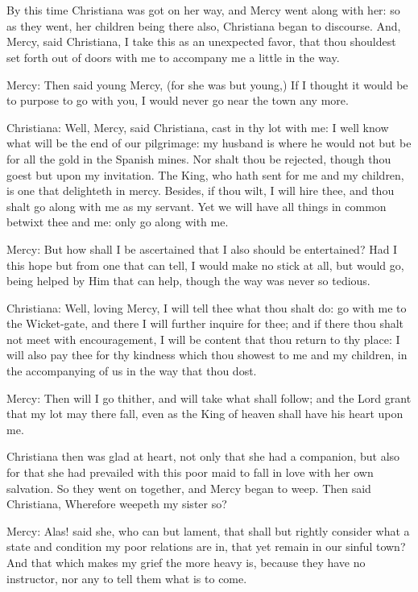 \chapter[THE FIRST STAGE]{}

By this time Christiana was got on her way, and Mercy went along with her: so as they went, her children being there also, Christiana began to discourse. And, Mercy, said Christiana, I take this as an unexpected favor, that thou shouldest set forth out of doors with me to accompany me a little in the way.

Mercy: Then said young Mercy, (for she was but young,) If I thought it would be to purpose to go with you, I would never go near the town any more.

Christiana: Well, Mercy, said Christiana, cast in thy lot with me: I well know what will be the end of our pilgrimage: my husband is where he would not but be for all the gold in the Spanish mines. Nor shalt thou be rejected, though thou goest but upon my invitation. The King, who hath sent for me and my children, is one that delighteth in mercy. Besides, if thou wilt, I will hire thee, and thou shalt go along with me as my servant. Yet we will have all things in common betwixt thee and me: only go along with me.

Mercy: But how shall I be ascertained that I also should be entertained? Had I this hope but from one that can tell, I would make no stick at all, but would go, being helped by Him that can help, though the way was never so tedious.

Christiana: Well, loving Mercy, I will tell thee what thou shalt do: go with me to the Wicket-gate, and there I will further inquire for thee; and if there thou shalt not meet with encouragement, I will be content that thou return to thy place: I will also pay thee for thy kindness which thou showest to me and my children, in the accompanying of us in the way that thou dost.

Mercy: Then will I go thither, and will take what shall follow; and the Lord grant that my lot may there fall, even as the King of heaven shall have his heart upon me.

Christiana then was glad at heart, not only that she had a companion, but also for that she had prevailed with this poor maid to fall in love with her own salvation. So they went on together, and Mercy began to weep. Then said Christiana, Wherefore weepeth my sister so?

Mercy: Alas! said she, who can but lament, that shall but rightly consider what a state and condition my poor relations are in, that yet remain in our sinful town? And that which makes my grief the more heavy is, because they have no instructor, nor any to tell them what is to come.

